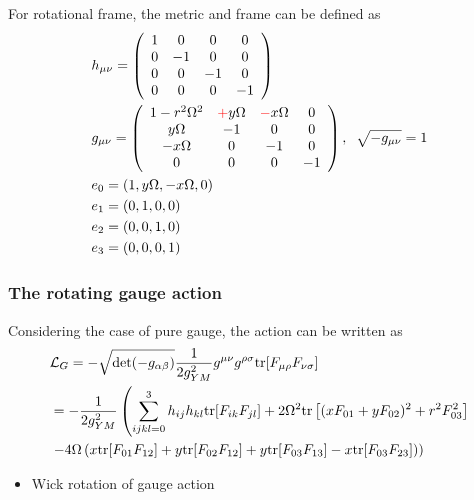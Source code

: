 For rotational frame, the metric and frame can be defined as
\begin{equation}
\begin{split}
&h_{\mu\nu}=\left(\begin{array}{cccc} 1 & 0 & 0 & 0 \\ 0 & -1 & 0 & 0 \\ 0 & 0 & -1 & 0 \\ 0 & 0 & 0 & -1 \end{array}\right)\\
&g_{\mu\nu}=\left(\begin{array}{cccc} 1-r^2\Omega^2 & \textcolor[rgb]{1,0,0}{+}y\Omega & \textcolor[rgb]{1,0,0}{-}x\Omega & 0 \\ y\Omega & -1 & 0 & 0 \\ -x\Omega & 0 & -1 & 0 \\ 0 & 0 & 0 & -1 \end{array}\right),\;\;\sqrt{-g_{\mu\nu}}=1\\
&e_0=(1,y\Omega,-x\Omega,0)\\
&e_1=(0,1,0,0)\\
&e_2=(0,0,1,0)\\
&e_3=(0,0,0,1)\\
\end{split}
\end{equation}

\subsubsection{\label{sec:RotatingGaugeAction}The rotating gauge action}

Considering the case of pure gauge, the action can be written as
\begin{equation}
\begin{split}
&\mathcal{L}_G=-\sqrt{\det (-g_{\alpha \beta})}\frac{1}{2g_{YM}^2}g^{\mu\nu}g^{\rho\sigma }{\rm tr}[F_{\mu\rho}F_{\nu\sigma}]\\
&=-\frac{1}{2g_{YM}^2}\left(\sum _{ijkl=0}^3 h_{ij}h_{kl}{\rm tr}[F_{ik}F_{jl}]+2\Omega^2 {\rm tr}\left[(x F_{01}+y F_{02})^2+r^2 F_{03}^2\right]\right.\\
&\left.-4\Omega\left(x {\rm tr}[F_{01}F_{12}]+y {\rm tr}[F_{02}F_{12}]+y {\rm tr}[F_{03}F_{13}]-x {\rm tr}[F_{03}F_{23}]\right)\right)
\end{split}
\end{equation}

\begin{itemize}
  \item Wick rotation of gauge action
\end{itemize}

